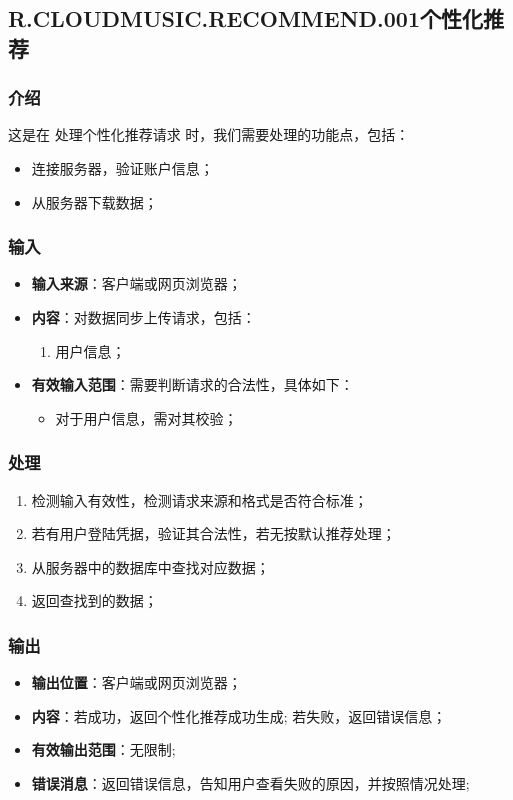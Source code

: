 \subsection{R.CLOUDMUSIC.RECOMMEND.001个性化推荐}
\subsubsection{介绍}
	这是在 处理个性化推荐请求 时，我们需要处理的功能点，包括：
	\begin{itemize}
		\item 连接服务器，验证账户信息；
		\item 从服务器下载数据；
	\end{itemize}
\subsubsection{输入}
	\begin{itemize}
		\item \textbf{输入来源}：客户端或网页浏览器；
		\item \textbf{内容}：对数据同步上传请求，包括：
		\begin{enumerate}
			\item 用户信息；
		\end{enumerate}
		\item \textbf{有效输入范围}：需要判断请求的合法性，具体如下：
		\begin{itemize}
			\item 对于用户信息，需对其校验； 
		\end{itemize}
	\end{itemize}
\subsubsection{处理}
	\begin{enumerate}
		\item 检测输入有效性，检测请求来源和格式是否符合标准；
		\item 若有用户登陆凭据，验证其合法性，若无按默认推荐处理；
		\item 从服务器中的数据库中查找对应数据；
		\item 返回查找到的数据；
	\end{enumerate}
\subsubsection{输出}
\begin{itemize}
	\item \textbf{输出位置}：客户端或网页浏览器；
	\item \textbf{内容}：若成功，返回个性化推荐成功生成; 若失败，返回错误信息；
	\item \textbf{有效输出范围}：无限制;
	\item \textbf{错误消息}：返回错误信息，告知用户查看失败的原因，并按照情况处理;
\end{itemize}

